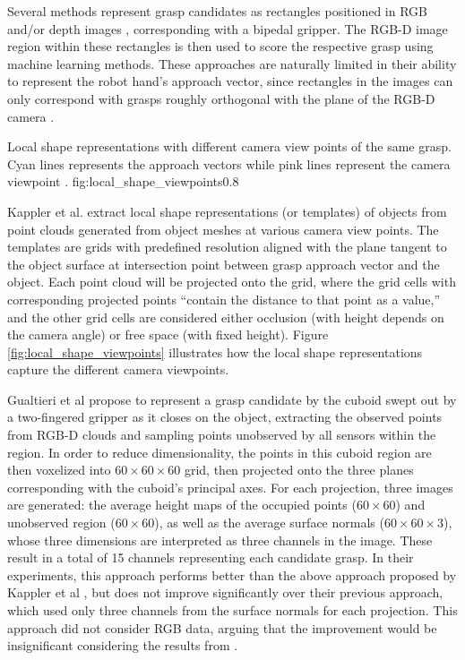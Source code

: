 Several methods represent grasp candidates as rectangles positioned in RGB and/or depth images \cite{lenz2015,jiang2011},
corresponding with a bipedal gripper. The RGB-D image region within these rectangles is then used to score the
respective grasp using machine learning methods. These approaches are naturally limited in their ability to represent
the robot hand's approach vector, since rectangles in the images can only correspond with grasps roughly orthogonal with
the plane of the RGB-D camera \cite{Gualtieri2016}.

             {Local shape representations with different camera view points of the same grasp. Cyan lines represents the
              approach vectors while pink lines represent the camera viewpoint \cite{Kappler2015}.}
             {fig:local_shape_viewpoints}{0.8\textwidth}

Kappler et al. \cite{Kappler2015} extract local shape representations (or templates) of objects from point clouds
generated from object meshes at various camera view points. The templates are grids with predefined resolution
aligned with the plane tangent to the object surface at intersection point between grasp approach vector and the
object. Each point cloud will be projected onto the grid, where the grid cells with corresponding projected points
``contain the distance to that point as a value,'' and the other grid cells are considered either occlusion
(with height depends on the camera angle) or free space (with fixed height). Figure \ref{fig:local_shape_viewpoints}
illustrates how the local shape representations capture the different camera viewpoints.

Gualtieri et al \cite{Gualtieri2016} propose to represent a grasp candidate by the cuboid swept out by a two-fingered
gripper as it closes on the object, extracting the observed points from RGB-D clouds and sampling points unobserved by
all sensors within the region. In order to reduce dimensionality, the points in this cuboid region are then voxelized
into $60 \times 60 \times 60$ grid, then projected onto the three planes corresponding with the cuboid's principal axes.
For each projection, three images are generated: the average height maps of the occupied points ($60 \times 60$) and
unobserved region ($60 \times 60$), as well as the average surface normals ($60 \times 60 \times 3$), whose three
dimensions are interpreted as three channels in the image. These result in a total of 15 channels representing each
candidate grasp. In their experiments, this approach performs better than the above approach proposed by Kappler et al
\cite{Kappler2015}, but does not improve significantly over their previous approach, which used only three channels from
the surface normals for each projection. This approach did not consider RGB data, arguing that the improvement would be
insignificant considering the results from \cite{lenz2015}.

